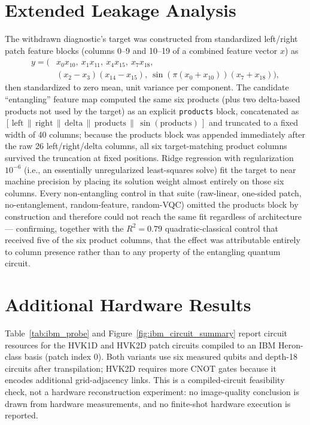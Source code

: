 \documentclass[journal]{IEEEtran}
\begin{document}
\section{Extended Leakage Analysis}
\label{app:leakage}
The withdrawn diagnostic's target was constructed from standardized left/right patch feature blocks (columns 0--9 and 10--19 of a combined feature vector $x$) as
\begin{equation}
\begin{aligned}
y = \bigl(&x_{0}x_{10},\ x_{1}x_{11},\ x_{4}x_{15},\ x_{7}x_{18},\\
&(x_{2}{-}x_{3})(x_{14}{-}x_{15}),\ \sin(\pi(x_0{+}x_{10}))(x_7{+}x_{18})\bigr),
\end{aligned}
\end{equation}
then standardized to zero mean, unit variance per component. The candidate ``entangling'' feature map computed the same six products (plus two delta-based products not used by the target) as an explicit \texttt{products} block, concatenated as $[\,\mathrm{left}\,\|\,\mathrm{right}\,\|\,\mathrm{delta}\,\|\,\mathrm{products}\,\|\,\sin(\mathrm{products})\,]$ and truncated to a fixed width of 40 columns; because the products block was appended immediately after the raw 26 left/right/delta columns, all six target-matching product columns survived the truncation at fixed positions. Ridge regression with regularization $10^{-6}$ (i.e., an essentially unregularized least-squares solve) fit the target to near machine precision by placing its solution weight almost entirely on those six columns. Every non-entangling control in that suite (raw-linear, one-sided patch, no-entanglement, random-feature, random-VQC) omitted the products block by construction and therefore could not reach the same fit regardless of architecture --- confirming, together with the $R^2=0.79$ quadratic-classical control that received five of the six product columns, that the effect was attributable entirely to column presence rather than to any property of the entangling quantum circuit.

\section{Additional Hardware Results}
\label{app:hardware}
Table~\ref{tab:ibm_probe} and Figure~\ref{fig:ibm_circuit_summary} report circuit resources for the HVK1D and HVK2D patch circuits compiled to an IBM Heron-class basis (patch index $0$). Both variants use six measured qubits and depth-18 circuits after transpilation; HVK2D requires more CNOT gates because it encodes additional grid-adjacency links. This is a compiled-circuit feasibility check, not a hardware reconstruction experiment: no image-quality conclusion is drawn from hardware measurements, and no finite-shot hardware execution is reported.
\end{document}
